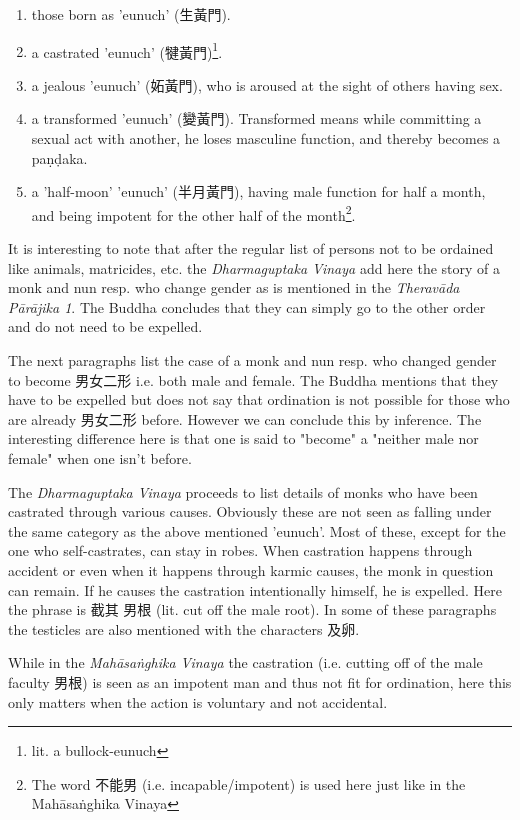 \begin{enumerate}
\item those born as 'eunuch' (生黃門). 
\item a castrated 'eunuch' (犍黃門)\footnote{lit. a bullock-eunuch}.
\item a jealous 'eunuch' (妬黃門), who is aroused at the sight of others having sex.
\item a transformed 'eunuch' (變黃門). Transformed means while committing a sexual act with another, he loses masculine function, and thereby becomes a paṇḍaka.
\item a 'half-moon' 'eunuch' (半月黃門), having male function for half a month, and being impotent for the other half of the month\footnote{The word 不能男 (i.e. incapable/impotent) is used here just like in the Mahāsaṅghika Vinaya}.
\end{enumerate}

It is interesting to note that after the regular list of persons not to be ordained like animals, matricides, etc. the {\em Dharmaguptaka Vinaya} add here the story of a monk and nun resp. who change gender as is mentioned in the {\em Theravāda Pārājika 1}. The Buddha concludes that they can simply go to the other order and do not need to be expelled.

The next paragraphs list the case of a monk and nun resp. who changed gender to become 男女二形 i.e. both male and female. The Buddha mentions that they have to be expelled but does not say that ordination is not possible for those who are already 男女二形 before. However we can conclude this by inference. The interesting difference here is that one is said to "become" a "neither male nor female" when one isn't before.

The {\em Dharmaguptaka Vinaya} proceeds to list details of monks who have been castrated through various causes. Obviously these are not seen as falling under the same category as the above mentioned 'eunuch'. Most of these, except for the one who self-castrates, can stay in robes. When castration happens through accident or even when it happens through karmic causes, the monk in question can remain. If he causes the castration intentionally himself, he is expelled. Here the phrase is 截其 男根 (lit. cut off the male root). In some of these paragraphs the testicles are also mentioned with the characters 及卵.

While in the {\em Mahāsaṅghika Vinaya} the castration (i.e. cutting off of the male faculty 男根) is seen as an impotent man and thus not fit for ordination, here this only matters when the action is voluntary and not accidental.


